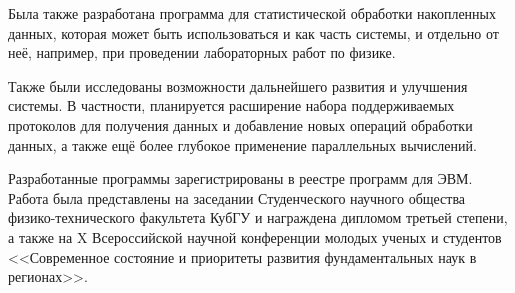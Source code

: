 \documentclass[a4paper, 14pt, titlepage]{extarticle}
\newcounter{firstpage}
\newcommand\lastPageHere{\setcounter{pagenum}{\value{page} - \value{firstpage}}}
\begin{document}
  Была также разработана программа для статистической обработки накопленных
  данных, которая может быть использоваться и как часть системы, и отдельно от неё, например, при
  проведении лабораторных работ по физике.

  Также были исследованы возможности дальнейшего развития и улучшения системы. В частности,
  планируется расширение набора поддерживаемых протоколов для получения данных и добавление новых
  операций обработки данных, а также ещё более глубокое применение параллельных вычислений.

  Разработанные программы зарегистрированы в реестре программ для ЭВМ. Работа была представлены на
  заседании Студенческого научного общества физико-технического факультета КубГУ и награждена
  дипломом третьей степени, а также на X Всероссийской научной конференции молодых ученых и
  студентов <<Современное состояние и приоритеты развития фундаментальных наук в регионах>>.

  \lastPageHere

  \begin{flushleft}
    
  \end{flushleft}
\end{document}
